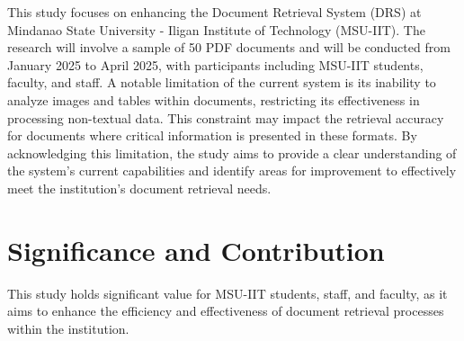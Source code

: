 \noindent This study focuses on enhancing the Document Retrieval System (DRS) at Mindanao State University - Iligan Institute of Technology (MSU-IIT). The research will involve a sample of 50 PDF documents and will be conducted from January 2025 to April 2025, with participants including MSU-IIT students, faculty, and staff. A notable limitation of the current system is its inability to analyze images and tables within documents, restricting its effectiveness in processing non-textual data. This constraint may impact the retrieval accuracy for documents where critical information is presented in these formats. By acknowledging this limitation, the study aims to provide a clear understanding of the system's current capabilities and identify areas for improvement to effectively meet the institution's document retrieval needs.

\section{Significance and Contribution} %

\noindent This study holds significant value for MSU-IIT students, staff, and faculty, as it aims to enhance the efficiency and effectiveness of document retrieval processes within the institution.




